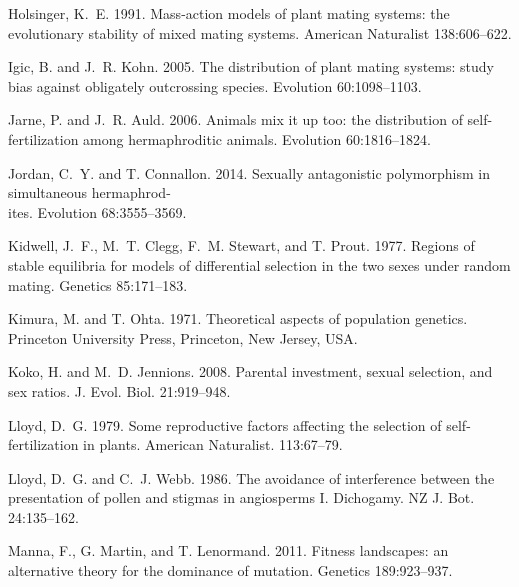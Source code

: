 \documentclass{article}
\begin{document}
\begin{thebibliography}{}
Holsinger, K.~E. 1991.
\newblock Mass-action models of plant mating systems: the evolutionary stability of mixed mating systems.
\newblock American Naturalist 138:606--622.

Igic, B. and J.~R. Kohn. 2005.
\newblock The distribution of plant mating systems: study bias against obligately outcrossing species.
\newblock Evolution 60:1098--1103.

Jarne, P. and J.~R. Auld. 2006.
\newblock Animals mix it up too: the distribution of self-fertilization among hermaphroditic animals.
\newblock Evolution 60:1816--1824.

Jordan, C.~Y. and T. Connallon. 2014.
\newblock Sexually antagonistic polymorphism in simultaneous hermaphrod-\\ites.
\newblock Evolution 68:3555--3569.

Kidwell, J.~F., M.~T. Clegg, F.~M. Stewart, and T. Prout. 1977.
\newblock Regions of stable equilibria for models of differential selection in the two sexes under random mating.
\newblock Genetics 85:171--183.

Kimura, M. and T. Ohta. 1971.
\newblock Theoretical aspects of population genetics.
\newblock Princeton University Press, Princeton, New Jersey, USA.

Koko, H. and M.~D. Jennions. 2008.
\newblock Parental investment, sexual selection, and sex ratios.
\newblock J. Evol. Biol. 21:919--948.

Lloyd, D.~G. 1979.
\newblock Some reproductive factors affecting the selection of self-fertilization in plants.
\newblock American Naturalist. 113:67--79.

Lloyd, D.~G. and C.~J. Webb. 1986.
\newblock The avoidance of interference between the presentation of pollen and stigmas in angiosperms I. Dichogamy.
\newblock NZ J. Bot. 24:135--162.

Manna, F., G. Martin, and T. Lenormand. 2011.
\newblock Fitness landscapes: an alternative theory for the dominance of mutation.
\newblock Genetics 189:923--937.


\end{thebibliography}
\end{document}
